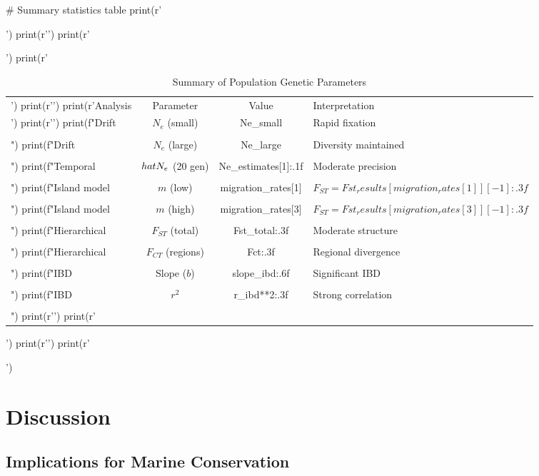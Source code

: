 \documentclass[11pt,a4paper]{article}
\begin{document}
\begin{pycode}
# Summary statistics table
print(r'\begin{table}[H]')
print(r'\centering')
print(r'\caption{Summary of Population Genetic Parameters}')
print(r'\begin{tabular}{@{}lccl@{}}')
print(r'\toprule')
print(r'Analysis & Parameter & Value & Interpretation \\')
print(r'\midrule')
print(f"Drift & $N_e$ (small) & {Ne_small} & Rapid fixation \\\\")
print(f"Drift & $N_e$ (large) & {Ne_large} & Diversity maintained \\\\")
print(f"Temporal & $\\hat{{N}}_e$ (20 gen) & {Ne_estimates[1]:.1f} & Moderate precision \\\\")
print(f"Island model & $m$ (low) & {migration_rates[1]} & $F_{{ST}} = {Fst_results[migration_rates[1]][-1]:.3f}$ \\\\")
print(f"Island model & $m$ (high) & {migration_rates[3]} & $F_{{ST}} = {Fst_results[migration_rates[3]][-1]:.3f}$ \\\\")
print(f"Hierarchical & $F_{{ST}}$ (total) & {Fst_total:.3f} & Moderate structure \\\\")
print(f"Hierarchical & $F_{{CT}}$ (regions) & {Fct:.3f} & Regional divergence \\\\")
print(f"IBD & Slope ($b$) & {slope_ibd:.6f} & Significant IBD \\\\")
print(f"IBD & $r^2$ & {r_ibd**2:.3f} & Strong correlation \\\\")
print(r'\bottomrule')
print(r'\end{tabular}')
print(r'\label{tab:summary}')
print(r'\end{table}')
\end{pycode}

\section{Discussion}

\subsection{Implications for Marine Conservation}
\end{document}
